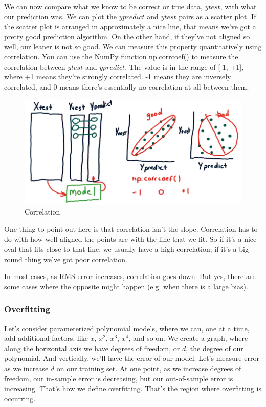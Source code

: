 \documentclass[12pt]{article}
\begin{document}
We can now compare what we know to be correct or true data, $ytest$, with what our prediction was. We can plot the $ypredict$ and $ytest$ pairs as a scatter plot. If the scatter plot is arranged in approximately a nice line, that means we've got a pretty good prediction algorithm. On the other hand, if they've not aligned so well, our leaner is not so good. We can measure this property quantitatively using correlation. You can use the NumPy function np.corrcoef() to measure the correlation between $ytest$ and $ypredict$. The value is in the range of [-1, +1], where +1 means they're strongly correlated. -1 means they are inversely correlated, and 0 means there's essentially no correlation at all between them. 

\begin{figure}[!ht]
\centering
\includegraphics[scale=0.4]{fig/fig89}
\caption{Correlation}
\end{figure}

One thing to point out here is that correlation isn't the slope. Correlation has to do with how well aligned the points are with the line that we fit. So if it's a nice oval that fits close to that line, we usually have a high correlation; if it's a big round thing we've got poor correlation. 

In most cases, as RMS error increases, correlation goes down. But yes, there are some cases where the opposite might happen (e.g. when there is a large bias).

\subsubsection{Overfitting}

Let's consider parameterized polynomial models, where we can, one at a time, add additional factors, like $x$, $x^2$, $x^3$, $x^4$, and so on. We create a graph, where along the horizontal axis we have degrees of freedom, or $d$, the degree of our polynomial. And vertically, we'll have the error of our model. Let's measure error as we increase $d$ on our training set. At one point, as we increase degrees of freedom, our in-sample error is decreasing, but our out-of-sample error is increasing. That's how we define overfitting. That's the region where overfitting is occurring. 
\end{document}
